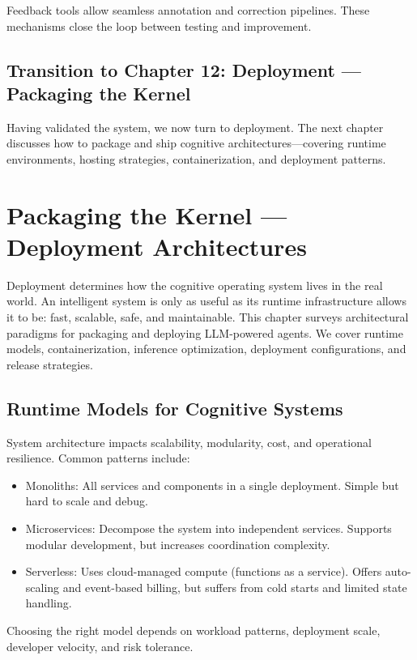 \documentclass{book}
\begin{document}
Feedback tools allow seamless annotation and correction pipelines. These mechanisms close the loop between testing and improvement.

\section*{Transition to Chapter 12: Deployment — Packaging the Kernel}

Having validated the system, we now turn to deployment. The next chapter discusses how to package and ship cognitive architectures—covering runtime environments, hosting strategies, containerization, and deployment patterns.

\chapter{Packaging the Kernel — Deployment Architectures}

Deployment determines how the cognitive operating system lives in the real world. An intelligent system is only as useful as its runtime infrastructure allows it to be: fast, scalable, safe, and maintainable. This chapter surveys architectural paradigms for packaging and deploying LLM-powered agents. We cover runtime models, containerization, inference optimization, deployment configurations, and release strategies.

\section{Runtime Models for Cognitive Systems}

System architecture impacts scalability, modularity, cost, and operational resilience. Common patterns include:

\begin{itemize}
  \item Monoliths: All services and components in a single deployment. Simple but hard to scale and debug.
  \item Microservices: Decompose the system into independent services. Supports modular development, but increases coordination complexity.
  \item Serverless: Uses cloud-managed compute (functions as a service). Offers auto-scaling and event-based billing, but suffers from cold starts and limited state handling.
\end{itemize}

Choosing the right model depends on workload patterns, deployment scale, developer velocity, and risk tolerance.
\end{document}
